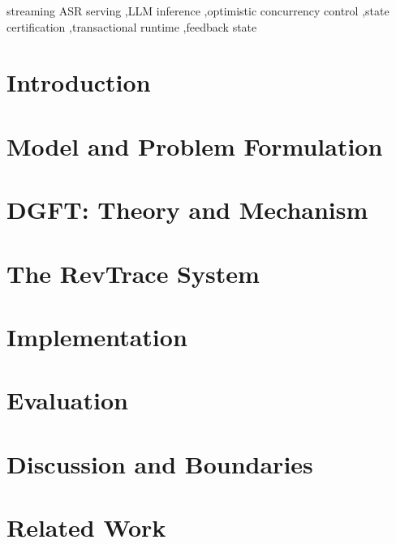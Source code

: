 \documentclass[5p]{elsarticle}
\theoremstyle{remark}
\begin{document}
\begin{frontmatter}
\begin{keyword}
streaming ASR serving \sep LLM inference \sep optimistic concurrency control
\sep state certification \sep transactional runtime \sep feedback state
\end{keyword}

\end{frontmatter}

\linenumbers  %

\section{Introduction}\label{sec:intro}


\section{Model and Problem Formulation}\label{sec:model}


\section{DGFT: Theory and Mechanism}\label{sec:dgft}


\section{The RevTrace System}\label{sec:system}


\section{Implementation}\label{sec:impl}


\section{Evaluation}\label{sec:eval}


\section{Discussion and Boundaries}\label{sec:discussion}


\section{Related Work}\label{sec:related}

\end{document}
